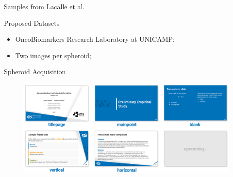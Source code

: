 \begin{frame}{Samples from Lacalle et al.}
\begin{figure}[!htb]
    \end{figure}
\end{frame}

\begin{frame}{Proposed Datasets}
    \begin{itemize}
        \item OncoBiomarkers Research Laboratory at UNICAMP;
        \item Two images per spheroid;
    \end{itemize}
\end{frame}


\begin{frame}{Spheroid Acquisition}
    \begin{figure}
        \centering
        \includegraphics[width=.9\textwidth]{readme/layouts.png}
    \end{figure}
\end{frame}

